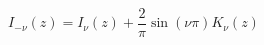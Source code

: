 \documentclass[12pt]{article}
\begin{document}
\begin{displaymath}
I_{-\nu}(z) = I_\nu(z) + \frac{2}{\pi}\sin(\nu\pi)K_\nu(z)
\end{displaymath}
\end{document}
